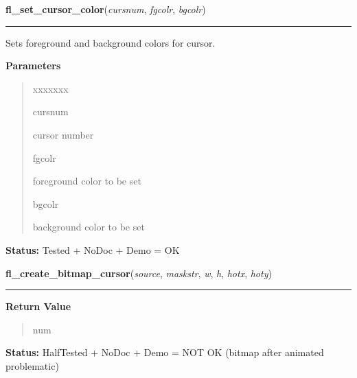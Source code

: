 \hspace{.8\funcindent}\begin{boxedminipage}{\funcwidth}

    \raggedright \textbf{fl\_set\_cursor\_color}(\textit{cursnum}, \textit{fgcolr}, \textit{bgcolr})

    \vspace{-1.5ex}

    \rule{\textwidth}{0.5\fboxrule}
\setlength{\parskip}{2ex}
    Sets foreground and background colors for cursor.

\setlength{\parskip}{1ex}
      \textbf{Parameters}
      \vspace{-1ex}

      \begin{quote}
        \begin{Ventry}{xxxxxxx}

          \item[cursnum]

          cursor number

          \item[fgcolr]

          foreground color to be set

          \item[bgcolr]

          background color to be set

        \end{Ventry}

      \end{quote}

\textbf{Status:} Tested + NoDoc + Demo = OK



    \end{boxedminipage}

    \label{xformslib:library:fl_create_bitmap_cursor}

    \vspace{0.5ex}

\hspace{.8\funcindent}\begin{boxedminipage}{\funcwidth}

    \raggedright \textbf{fl\_create\_bitmap\_cursor}(\textit{source}, \textit{maskstr}, \textit{w}, \textit{h}, \textit{hotx}, \textit{hoty})

    \vspace{-1.5ex}

    \rule{\textwidth}{0.5\fboxrule}
\setlength{\parskip}{2ex}
\setlength{\parskip}{1ex}
      \textbf{Return Value}
    \vspace{-1ex}

      \begin{quote}
      num

      \end{quote}

\textbf{Status:} HalfTested + NoDoc + Demo = NOT OK (bitmap after animated problematic)



    \end{boxedminipage}

